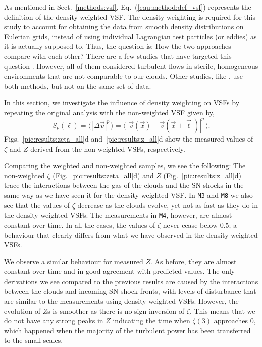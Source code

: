 As mentioned in Sect.~\ref{methods:vsf}, Eq.~(\ref{equ:method:def_vsf}) represents the definition of the density-weighted VSF.
The density weighting is required for this study to account for obtaining the data from smooth density distributions on Eulerian grids, instead of using individual Lagrangian test particles (or eddies) as it is actually supposed to.
Thus, the question is: How the two approaches compare with each other?
There are a few studies that have targeted this question \citep[e.g.,][]{Benzi1993,Benzi2010,Gotoh2002,Schmidt2008}. 
However, all of them considered turbulent flows in sterile, homogeneous environments that are not comparable to our clouds.
Other studies, like \citet{Padoan2016a}, use both methods, but not on the same set of data. 

In this section, we investigate the influence of density weighting on VSFs by repeating the original analysis with the non-weighted VSF given by,
\begin{equation}
	\mathit{S}_p (\ell) = \langle \, |\Delta \vec{v}|^p  \, \rangle = \langle \, |\vec{v}(\vec{x}) - \vec{v}(\vec{x} + \vec{\ell})|^p  \, \rangle .
    \label{equ:results:def_vsf_no}
\end{equation}
Figs.~\ref{pic:results:zeta_all}d and~\ref{pic:results:z_all}d show the measured values of $\zeta$ and $Z$ derived from the non-weighted VSFs, respectively.

Comparing the weighted and non-weighted samples, we see the following:
The non-weighted $\zeta$ (Fig.~\ref{pic:results:zeta_all}d) and $Z$ (Fig.~\ref{pic:results:z_all}d) trace the interactions between the gas of the clouds and the SN shocks in the same way as we have seen it for the density-weighted VSF.
In \texttt{M3} and \texttt{M8} we also see that the values of $\zeta$ decrease as the clouds evolve, yet not as fast as they do in the density-weighted VSFs. 
The measurements in \texttt{M4}, however, are almost constant over time. 
In all the cases, the values of $\zeta$ never cease below 0.5; a behaviour that clearly differs from what we have observed in the density-weighted VSFs.

We observe a similar behaviour for measured $Z$. 
As before, they are almost constant over time and in good agreement with predicted values.
The only derivations we see compared to the previous results are caused by the interactions between the clouds and incoming SN shock fronts, with levels of disturbance that are similar to the measurements using density-weighted VSFs. 
However, the evolution of $Z$s is smoother as there is no sign inversion of $\zeta$.
This means that we do not have any strong peaks in $Z$ indicating the time when $\zeta(3)$ approaches 0, which happened when the majority of the turbulent power has been transferred to the small scales. 

